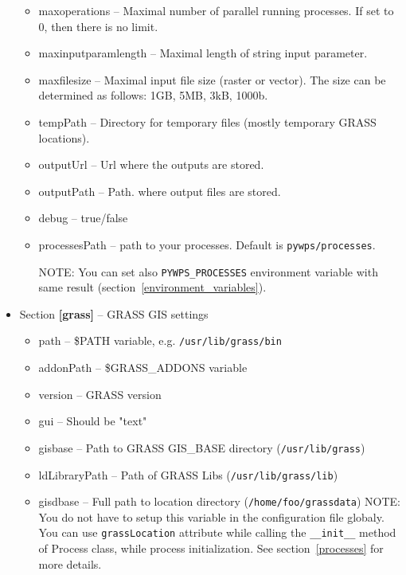 \documentclass[a4paper,11pt]{report}
\begin{document}
\begin{itemize}
\begin{itemize}
            \item maxoperations -- Maximal number of parallel running
            processes. If set to 0, then there is no limit.
            \item maxinputparamlength -- Maximal length of string input
            parameter.
            \item maxfilesize -- Maximal input file size (raster or
            vector). The size can be determined as follows: 1GB, 5MB, 3kB,
            1000b.
            \item tempPath -- Directory for temporary files (mostly
            temporary GRASS locations).
            \item outputUrl -- Url where the outputs are stored.
            \item outputPath -- Path. where output files are stored.
            \item debug -- true/false
            \item processesPath -- path to your processes. Default is
            \texttt{pywps/processes}. 

            NOTE: You can set also \texttt{PYWPS\_PROCESSES} environment
            variable with same result (section~\ref{environment_variables}).
        \end{itemize}
    \item Section \textbf{[grass]} -- GRASS GIS settings
        \begin{itemize}
            \item path -- \$PATH variable, e.g. \texttt{/usr/lib/grass/bin}
            \item addonPath -- \$GRASS\_ADDONS variable
            \item version -- GRASS version
            \item gui -- Should be "text"
            \item gisbase -- Path to GRASS GIS\_BASE directory
            (\texttt{/usr/lib/grass})
            \item ldLibraryPath -- Path of GRASS Libs
            (\texttt{/usr/lib/grass/lib})
	    \item gisdbase -- Full path to location directory 
	    (\texttt{/home/foo/grassdata}) NOTE: You do not have to setup
            this variable in the configuration file globaly. You can use
            \texttt{grassLocation} attribute while calling the
            \texttt{\_\_init\_\_} method of Process class, while process
            initialization. See section~\ref{processes} for more details.
        \end{itemize}
\end{itemize}
\end{document}
